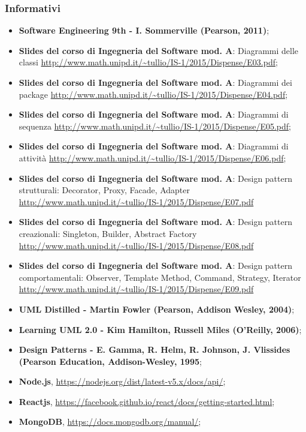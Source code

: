 \subsubsection{Informativi}
\begin{itemize}
\item \textbf{Software Engineering 9th - I. Sommerville (Pearson, 2011)};
\item \textbf{Slides del corso di Ingegneria del Software mod. A}: Diagrammi delle classi \url{http://www.math.unipd.it/~tullio/IS-1/2015/Dispense/E03.pdf};
\item \textbf{Slides del corso di Ingegneria del Software mod. A}: Diagrammi dei package \url{http://www.math.unipd.it/~tullio/IS-1/2015/Dispense/E04.pdf};
\item \textbf{Slides del corso di Ingegneria del Software mod. A}: Diagrammi di sequenza \url{http://www.math.unipd.it/~tullio/IS-1/2015/Dispense/E05.pdf};
\item \textbf{Slides del corso di Ingegneria del Software mod. A}: Diagrammi di attività \url{http://www.math.unipd.it/~tullio/IS-1/2015/Dispense/E06.pdf};
\item \textbf{Slides del corso di Ingegneria del Software mod. A}: Design pattern strutturali: Decorator, Proxy, Facade, Adapter \url{http://www.math.unipd.it/~tullio/IS-1/2015/Dispense/E07.pdf}
\item \textbf{Slides del corso di Ingegneria del Software mod. A}: Design pattern creazionali: Singleton, Builder, Abstract Factory \url{http://www.math.unipd.it/~tullio/IS-1/2015/Dispense/E08.pdf}
\item \textbf{Slides del corso di Ingegneria del Software mod. A}: Design pattern comportamentali: Observer, Template Method, Command, Strategy, Iterator \url{http://www.math.unipd.it/~tullio/IS-1/2015/Dispense/E09.pdf}
\item \textbf{UML Distilled - Martin Fowler (Pearson, Addison Wesley, 2004)};
\item \textbf{Learning UML 2.0 - Kim Hamilton, Russell Miles (O’Reilly, 2006)};
\item \textbf{Design Patterns - E. Gamma, R. Helm, R. Johnson, J. Vlissides (Pearson Education, Addison-Wesley, 1995};
\item \textbf{Node.js}, \url{https://nodejs.org/dist/latest-v5.x/docs/api/};
\item \textbf{Reactjs}, \url{https://facebook.github.io/react/docs/getting-started.html};
\item \textbf{MongoDB}, \url{https://docs.mongodb.org/manual/};

\end{itemize}
